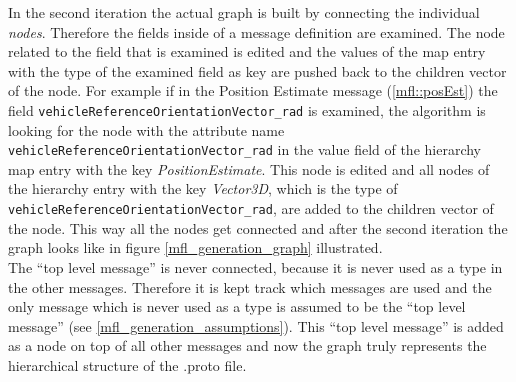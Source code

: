 In the second iteration the actual graph is built by connecting the individual \emph{nodes}. Therefore the fields inside of a message definition are examined. The node related to the field that is examined is edited and the values of the map entry with the type of the examined field as key are pushed back to the children vector of the node. For example if in the Position Estimate message (\ref{mfl::posEst}) the field \verb|vehicleReferenceOrientationVector_rad| is examined, the algorithm is looking for the node with the attribute name \verb|vehicleReferenceOrientationVector_rad| in the value field of the hierarchy map entry with the key \emph{PositionEstimate}. This node is edited and all nodes of the hierarchy entry with the key \emph{Vector3D}, which is the type of \verb|vehicleReferenceOrientationVector_rad|, are added to the children vector of the node. This way all the nodes get connected and after the second iteration the graph looks like in figure \ref{mfl_generation_graph} illustrated.\\
The \enquote{top level message} is never connected, because it is never used as a type in the other messages. Therefore it is kept track which messages are used and the only message which is never used as a type is assumed to be the \enquote{top level message} (see \ref{mfl_generation_assumptions}). This \enquote{top level message} is added as a node on top of all other messages and now the graph truly represents the hierarchical structure of the .proto file.
